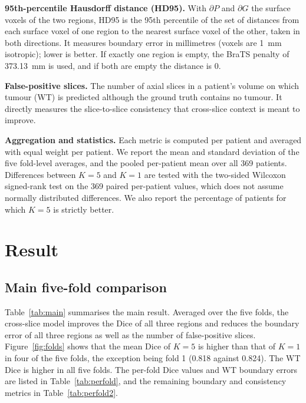 \textbf{95th-percentile Hausdorff distance (HD95).} With $\partial P$ and $\partial G$ the surface voxels of the two regions, HD95 is the 95th percentile of the set of distances from each surface voxel of one region to the nearest surface voxel of the other, taken in both directions. It measures boundary error in millimetres (voxels are 1~mm isotropic); lower is better. If exactly one region is empty, the BraTS penalty of 373.13~mm is used, and if both are empty the distance is 0.

\textbf{False-positive slices.} The number of axial slices in a patient's volume on which tumour (WT) is predicted although the ground truth contains no tumour. It directly measures the slice-to-slice consistency that cross-slice context is meant to improve.

\textbf{Aggregation and statistics.} Each metric is computed per patient and averaged with equal weight per patient. We report the mean and standard deviation of the five fold-level averages, and the pooled per-patient mean over all 369 patients. Differences between $K=5$ and $K=1$ are tested with the two-sided Wilcoxon signed-rank test on the 369 paired per-patient values, which does not assume normally distributed differences. We also report the percentage of patients for which $K=5$ is strictly better.

\section{Result}
\subsection{Main five-fold comparison}
Table~\ref{tab:main} summarises the main result. Averaged over the five folds, the cross-slice model improves the Dice of all three regions and reduces the boundary error of all three regions as well as the number of false-positive slices. Figure~\ref{fig:folds} shows that the mean Dice of $K=5$ is higher than that of $K=1$ in four of the five folds, the exception being fold 1 (0.818 against 0.824). The WT Dice is higher in all five folds. The per-fold Dice values and WT boundary errors are listed in Table~\ref{tab:perfold}, and the remaining boundary and consistency metrics in Table~\ref{tab:perfold2}.

